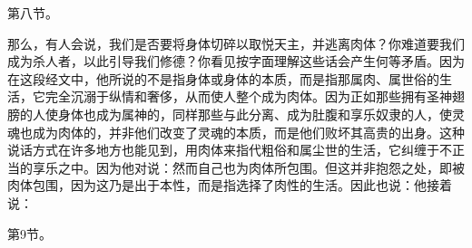 第八节。\par

那么，有人会说，我们是否要将身体切碎以取悦天主，并逃离肉体？你难道要我们成为杀人者，以此引导我们修德？你看见按字面理解这些话会产生何等矛盾。因为在这段经文中，他所说的不是指身体或身体的本质，而是指那属肉、属世俗的生活，它完全沉溺于纵情和奢侈，从而使人整个成为肉体。因为正如那些拥有圣神翅膀的人使身体也成为属神的，同样那些与此分离、成为肚腹和享乐奴隶的人，使灵魂也成为肉体的，并非他们改变了灵魂的本质，而是他们败坏其高贵的出身。这种说话方式在许多地方也能见到，用肉体来指代粗俗和属尘世的生活，它纠缠于不正当的享乐之中。因为他对说：然而自己也为肉体所包围。但这并非抱怨之处，即被肉体包围，因为这乃是出于本性，而是指选择了肉性的生活。因此也说：他接着说：\par

第9节。\par

